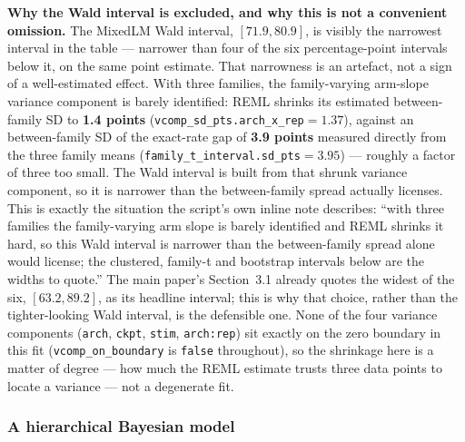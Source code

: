 \documentclass[11pt]{article}
\begin{document}
\noindent\textbf{Why the Wald interval is excluded, and why this is not a
convenient omission.} The MixedLM Wald interval, $[71.9, 80.9]$, is visibly the
narrowest interval in the table --- narrower than four of the six percentage-point
intervals below it, on the same point estimate. That narrowness is an artefact,
not a sign of a well-estimated effect. With three families, the family-varying
arm-slope variance component is barely identified: REML shrinks its estimated
between-family SD to \textbf{1.4 points}
(\texttt{vcomp\_sd\_pts.arch\_x\_rep}$=1.37$), against an between-family SD of
the exact-rate gap of \textbf{3.9 points} measured directly from the three family
means (\texttt{family\_t\_interval.sd\_pts}$=3.95$) --- roughly a factor of three
too small. The Wald interval is built from that shrunk variance component, so it
is narrower than the between-family spread actually licenses. This is exactly
the situation the script's own inline note describes: ``with three families the
family-varying arm slope is barely identified and REML shrinks it hard, so this
Wald interval is narrower than the between-family spread alone would license;
the clustered, family-t and bootstrap intervals below are the widths to quote.''
The main paper's Section~3.1 already quotes the widest of the six,
$[63.2,89.2]$, as its headline interval; this is why that choice, rather than
the tighter-looking Wald interval, is the defensible one. None of the four
variance components (\texttt{arch}, \texttt{ckpt}, \texttt{stim},
\texttt{arch:rep}) sit exactly on the zero boundary in this fit
(\texttt{vcomp\_on\_boundary} is \texttt{false} throughout), so the shrinkage
here is a matter of degree --- how much the REML estimate trusts three data
points to locate a variance --- not a degenerate fit.

\subsubsection{A hierarchical Bayesian model}
\end{document}

